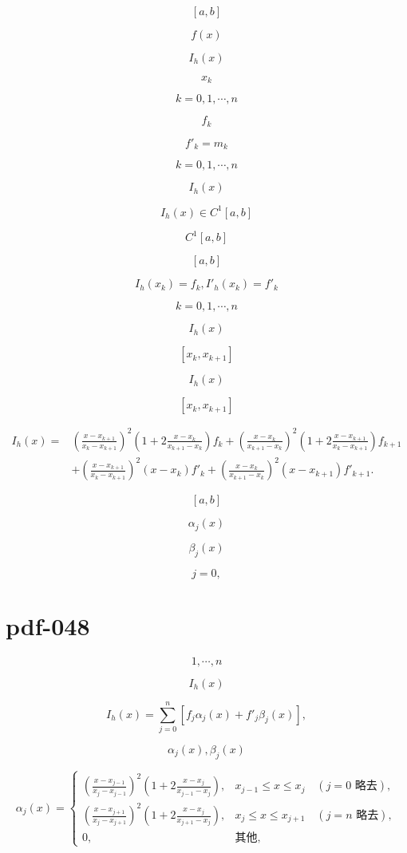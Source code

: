 \documentclass[fontset=fandol]{ctexart}
\begin{document}
\[[a,b]\]

\[f(x)\]

\[I_h(x)\]

\[x_k\]

\[k=0,1,\cdots,n\]

\[f_k\]

\[f'_k=m_k\]

\[k=0,1,\cdots,n\]

\[I_h(x)\]

\[I_h(x)\in C^1[a,b]\]

\[C^1[a,b]\]

\[[a,b]\]

\[I_h(x_k)=f_k,I'_h(x_k)=f'_k\]

\[k=0,1,\cdots,n\]

\[I_h(x)\]

\[[x_k,x_{k+1}]\]

\[I_h(x)\]

\[[x_k,x_{k+1}]\]

\[\begin{aligned}
I_h(x)={}&\left(\frac{x-x_{k+1}}{x_k-x_{k+1}}\right)^2\left(1+2\frac{x-x_k}{x_{k+1}-x_k}\right)f_k+\left(\frac{x-x_k}{x_{k+1}-x_k}\right)^2\left(1+2\frac{x-x_{k+1}}{x_k-x_{k+1}}\right)f_{k+1}\\
&+\left(\frac{x-x_{k+1}}{x_k-x_{k+1}}\right)^2(x-x_k)f'_k+\left(\frac{x-x_k}{x_{k+1}-x_k}\right)^2(x-x_{k+1})f'_{k+1}.
\end{aligned}\tag{2.7.5}\]

\[[a,b]\]

\[\alpha_j(x)\]

\[\beta_j(x)\]

\[j=0,\]

\section*{pdf-048}

\[1,\cdots,n\]

\[I_h(x)\]

\[I_h(x)=\sum_{j=0}^n[f_j\alpha_j(x)+f'_j\beta_j(x)],\tag{2.7.6}\]

\[\alpha_j(x),\beta_j(x)\]

\[\alpha_j(x)=\begin{cases}
\displaystyle\left(\frac{x-x_{j-1}}{x_j-x_{j-1}}\right)^2\left(1+2\frac{x-x_j}{x_{j-1}-x_j}\right),&x_{j-1}\leqslant x\leqslant x_j\quad(j=0\text{ 略去}),\\[6pt]
\displaystyle\left(\frac{x-x_{j+1}}{x_j-x_{j+1}}\right)^2\left(1+2\frac{x-x_j}{x_{j+1}-x_j}\right),&x_j\leqslant x\leqslant x_{j+1}\quad(j=n\text{ 略去}),\\[6pt]
0,&\text{其他},
\end{cases}\tag{2.7.7}\]
\end{document}
